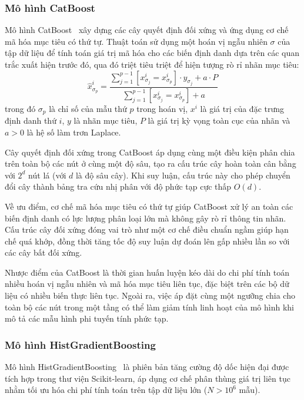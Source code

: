 \subsubsection{Mô hình CatBoost}

Mô hình CatBoost~\cite{catboost} xây dựng các cây quyết định đối xứng và ứng dụng cơ chế mã hóa mục tiêu có thứ tự. Thuật toán sử dụng một hoán vị ngẫu nhiên $\sigma$ của tập dữ liệu để tính toán giá trị mã hóa cho các biến định danh dựa trên các quan trắc xuất hiện trước đó, qua đó triệt tiêu triệt để hiện tượng rò rỉ nhãn mục tiêu:
\begin{equation*}
    \hat{x}_{\sigma_p}^i = \frac{\sum_{j=1}^{p-1} [x_{\sigma_j}^i = x_{\sigma_p}^i] \cdot y_{\sigma_j} + a \cdot P}{\sum_{j=1}^{p-1} [x_{\sigma_j}^i = x_{\sigma_p}^i] + a}
\end{equation*}
trong đó $\sigma_p$ là chỉ số của mẫu thứ $p$ trong hoán vị, $x^i$ là giá trị của đặc trưng định danh thứ $i$, $y$ là nhãn mục tiêu, $P$ là giá trị kỳ vọng toàn cục của nhãn và $a > 0$ là hệ số làm trơn Laplace.

Cây quyết định đối xứng trong CatBoost áp dụng cùng một điều kiện phân chia trên toàn bộ các nút ở cùng một độ sâu, tạo ra cấu trúc cây hoàn toàn cân bằng với $2^d$ nút lá (với $d$ là độ sâu cây). Khi suy luận, cấu trúc này cho phép chuyển đổi cây thành bảng tra cứu nhị phân với độ phức tạp cực thấp $O(d)$.

Về ưu điểm, cơ chế mã hóa mục tiêu có thứ tự giúp CatBoost xử lý an toàn các biến định danh có lực lượng phân loại lớn mà không gây rò rỉ thông tin nhãn. Cấu trúc cây đối xứng đóng vai trò như một cơ chế điều chuẩn ngầm giúp hạn chế quá khớp, đồng thời tăng tốc độ suy luận dự đoán lên gấp nhiều lần so với các cây bất đối xứng.

Nhược điểm của CatBoost là thời gian huấn luyện kéo dài do chi phí tính toán nhiều hoán vị ngẫu nhiên và mã hóa mục tiêu liên tục, đặc biệt trên các bộ dữ liệu có nhiều biến thực liên tục. Ngoài ra, việc áp đặt cùng một ngưỡng chia cho toàn bộ các nút trong một tầng có thể làm giảm tính linh hoạt của mô hình khi mô tả các mẫu hình phi tuyến tính phức tạp.

\subsubsection{Mô hình HistGradientBoosting}

Mô hình HistGradientBoosting~\cite{hist_gb} là phiên bản tăng cường độ dốc hiện đại được tích hợp trong thư viện Scikit-learn, áp dụng cơ chế phân thùng giá trị liên tục nhằm tối ưu hóa chi phí tính toán trên tập dữ liệu lớn ($N > 10^6$ mẫu).


